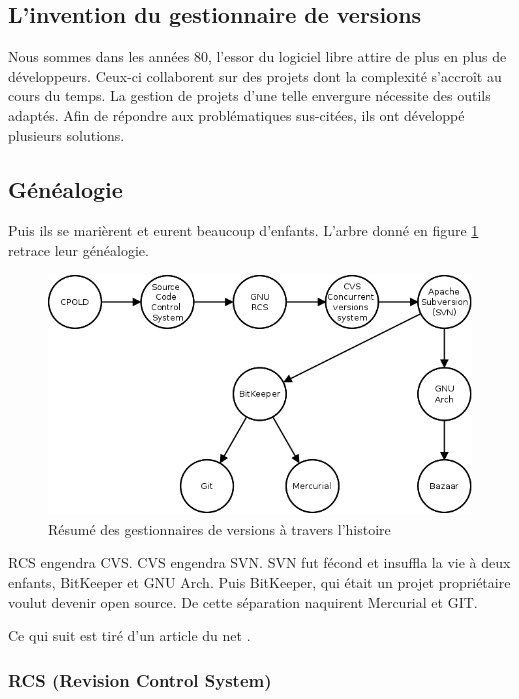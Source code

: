 \subsection{L'invention du gestionnaire de versions}

Nous sommes dans les années 80, l'essor du logiciel libre attire de plus en plus de développeurs. 
Ceux-ci collaborent sur des projets dont la complexité s'accroît au cours du temps. 
La gestion de projets d'une telle envergure nécessite des outils adaptés. 
Afin de répondre aux problématiques sus-citées, ils ont développé plusieurs solutions. 

\subsection{Généalogie}

Puis ils se marièrent et eurent beaucoup d'enfants. L'arbre donné en figure \ref{fig:chronologie} retrace leur généalogie. 


\begin{figure}[h!]
  \centerline{
  \includegraphics[width=14cm]{images/chronologie.png}}
  \caption{Résumé des gestionnaires de versions à travers l'histoire}
  \label{fig:chronologie}
\end{figure}

RCS engendra CVS. CVS engendra SVN. SVN fut fécond et insuffla la vie à deux enfants, BitKeeper et GNU Arch. 
Puis BitKeeper, qui était un projet propriétaire voulut devenir open source. De cette séparation naquirent Mercurial et GIT. 

Ce qui suit est tiré d'un article du net \cite{Article-hist-A}. 

\subsubsection{RCS (Revision Control System)}

